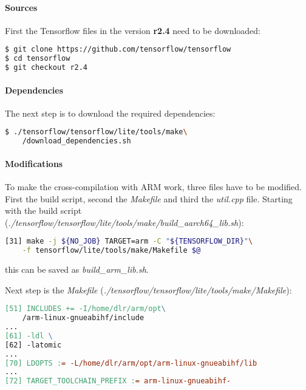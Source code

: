 \paragraph*{Sources} \hfill

First the Tensorflow files in the version \textbf{r2.4} need to be downloaded:

\begin{lstlisting}[caption={git clone}, language=bash]
$ git clone https://github.com/tensorflow/tensorflow
$ cd tensorflow
$ git checkout r2.4
\end{lstlisting}

\paragraph*{Dependencies} \hfill

The next step is to download the required dependencies:

\begin{lstlisting}[caption={dependencies}, language=bash]
$ ./tensorflow/tensorflow/lite/tools/make\
	/download_dependencies.sh
\end{lstlisting}

\paragraph*{Modifications} \hfill

To make the cross-compilation with ARM work, three files have to be modified. First the build script, second the \textit{Makefile} and third the \textit{util.cpp} file. Starting with the build script (\textit{./tensorflow/tensorflow/lite/tools/make/build\_aarch64\_lib.sh}):

\begin{lstlisting}[caption={build\_aarch64\_lib.sh}, language=bash]
[31] make -j ${NO_JOB} TARGET=arm -C "${TENSORFLOW_DIR}"\
	-f tensorflow/lite/tools/make/Makefile $@
\end{lstlisting}

this can be saved as \textit{build\_arm\_lib.sh}.

Next step is the \textit{Makefile} (\textit{./tensorflow/tensorflow/lite/tools/make/Makefile}):

\begin{lstlisting}[caption={Makefile}, language=make]
[51] INCLUDES += -I/home/dlr/arm/opt\
	/arm-linux-gnueabihf/include
...
[61] -ldl \
[62] -latomic
...
[70] LDOPTS := -L/home/dlr/arm/opt/arm-linux-gnueabihf/lib
...
[72] TARGET_TOOLCHAIN_PREFIX := arm-linux-gnueabihf-
\end{lstlisting}

